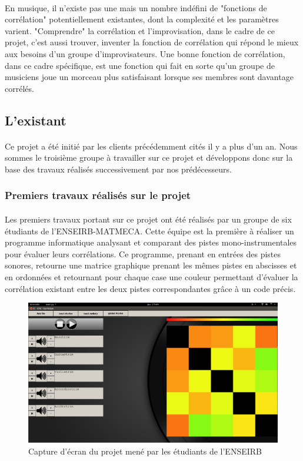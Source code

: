 \paragraph{}
En musique, il n'existe pas une mais un nombre indéfini de "fonctions
de corrélation" potentiellement existantes, dont la complexité et les
paramètres varient. "Comprendre" la corrélation et l'improvisation,
dans le cadre de ce projet, c'est aussi trouver, inventer la fonction
de corrélation qui répond le mieux aux besoins d'un groupe
d'improvisateurs. Une bonne fonction de corrélation, dans ce cadre
spécifique, est une fonction qui fait en sorte qu'un groupe de
musiciens joue un morceau plus satisfaisant lorsque ses membres sont
davantage corrélés.

\subsection{L'existant}
\paragraph{}
Ce projet a été initié par les clients précédemment cités il y a plus
d'un an. Nous sommes le troisième groupe à travailler sur ce projet et
développons donc sur la base des travaux réalisés successivement par
nos prédécesseurs.

\subsubsection{Premiers travaux réalisés sur le projet}
\paragraph{}
Les premiers travaux portant sur ce projet ont été réalisés par un
groupe de six étudiants de l'ENSEIRB-MATMECA. Cette équipe est la
première à réaliser un programme informatique analysant et comparant
des pistes mono-instrumentales pour évaluer leurs corrélations. Ce
programme, prenant en entrées des pistes sonores, retourne une matrice
graphique prenant les mêmes pistes en abscisses et en ordonnées et
retournant pour chaque case une couleur permettant d'évaluer la
corrélation existant entre les deux pistes correspondantes grâce à un
code précis.
  \begin{figure}[h]
    \centering
    \includegraphics[scale=0.5]{matriceenseirb.png}
    \caption{Capture d'écran du projet mené par les étudiants de l'ENSEIRB}
    \label{matrice-enseirb}
  \end{figure}

